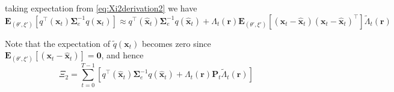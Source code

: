 \documentclass[]{article}
\begin{document}
taking expectation from \ref{eq:Xi2derivation2} we have 
\begin{equation}\label{eq:Xi2derivation3}
\mathbf E_{(\theta',\xi')}\left[ q^\top(\mathbf x_t)\boldsymbol\Sigma_e^{-1}q(\mathbf x_t)\right]\approx q^\top(\mathbf {\hat x}_t)\boldsymbol\Sigma_e^{-1}q(\mathbf {\hat x}_t)  +\Lambda_t(\mathbf r)\mathbf E_{(\theta',\xi')}\left[  (\mathbf x_t - \mathbf  {\hat x}_t) (\mathbf x_t - \mathbf  {\hat x}_t)^\top\right]\tilde{\Lambda}_t(\mathbf r)
\end{equation}


Note that the expectation of $\tilde{q}(\mathbf x_t)$ becomes zero since $\mathbf E_{(\theta',\xi')}\left[(\mathbf x_t - \mathbf  {\hat x}_t)\right]= \mathbf 0$, and hence
\begin{equation}
 \Xi_2= \sum_{t=0}^{T-1}\left[q^\top(\mathbf{\hat x}_t)\boldsymbol\Sigma_e^{-1}q(\mathbf{\hat x}_t)+\Lambda_t(\mathbf r)\mathbf P_t \tilde{\Lambda}_t(\mathbf r)\right]
\end{equation}
\end{document}

